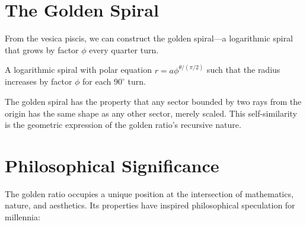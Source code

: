 \begin{table}[H]
\centering
\caption{Golden Ratio Convergents via Continued Fraction}
\end{table}

\section{The Golden Spiral}

From the vesica piscis, we can construct the golden spiral—a logarithmic spiral that grows by factor $\phi$ every quarter turn.

\begin{definition}
A logarithmic spiral with polar equation $r = a\phi^{\theta/(\pi/2)}$ such that the radius increases by factor $\phi$ for each $90^\circ$ turn.
\end{definition}

The golden spiral has the property that any sector bounded by two rays from the origin has the same shape as any other sector, merely scaled. This self-similarity is the geometric expression of the golden ratio's recursive nature.

\section{Philosophical Significance}

The golden ratio occupies a unique position at the intersection of mathematics, nature, and aesthetics. Its properties have inspired philosophical speculation for millennia:

